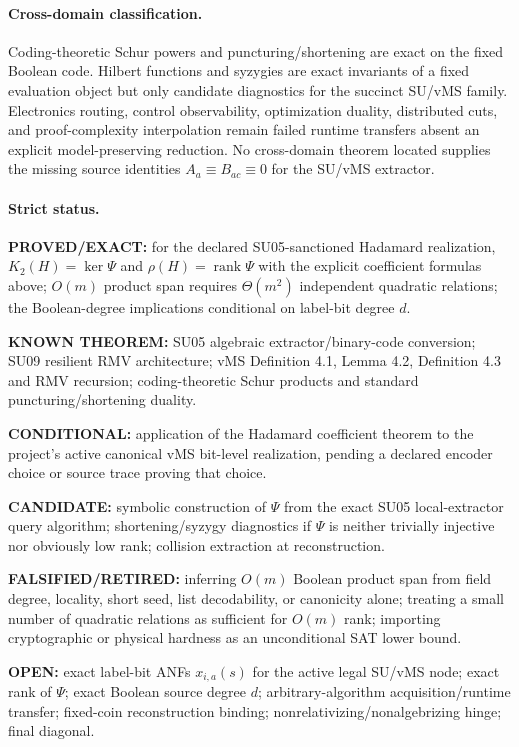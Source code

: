 \documentclass[11pt]{article}
\begin{document}
\paragraph{Cross-domain classification.}
Coding-theoretic Schur powers and puncturing/shortening are exact on the fixed Boolean code. Hilbert functions and syzygies are exact invariants of a fixed evaluation object but only candidate diagnostics for the succinct SU/vMS family. Electronics routing, control observability, optimization duality, distributed cuts, and proof-complexity interpolation remain failed runtime transfers absent an explicit model-preserving reduction. No cross-domain theorem located supplies the missing source identities $A_a\equiv B_{ac}\equiv0$ for the SU/vMS extractor.

\paragraph{Strict status.}
\textbf{PROVED/EXACT:} for the declared SU05-sanctioned Hadamard realization, $K_2(H)=\ker\Psi$ and $\rho(H)=\operatorname{rank}\Psi$ with the explicit coefficient formulas above; $O(m)$ product span requires $\Theta(m^2)$ independent quadratic relations; the Boolean-degree implications conditional on label-bit degree $d$.

\textbf{KNOWN THEOREM:} SU05 algebraic extractor/binary-code conversion; SU09 resilient RMV architecture; vMS Definition 4.1, Lemma 4.2, Definition 4.3 and RMV recursion; coding-theoretic Schur products and standard puncturing/shortening duality.

\textbf{CONDITIONAL:} application of the Hadamard coefficient theorem to the project's active canonical vMS bit-level realization, pending a declared encoder choice or source trace proving that choice.

\textbf{CANDIDATE:} symbolic construction of $\Psi$ from the exact SU05 local-extractor query algorithm; shortening/syzygy diagnostics if $\Psi$ is neither trivially injective nor obviously low rank; collision extraction at reconstruction.

\textbf{FALSIFIED/RETIRED:} inferring $O(m)$ Boolean product span from field degree, locality, short seed, list decodability, or canonicity alone; treating a small number of quadratic relations as sufficient for $O(m)$ rank; importing cryptographic or physical hardness as an unconditional SAT lower bound.

\textbf{OPEN:} exact label-bit ANFs $x_{i,a}(s)$ for the active legal SU/vMS node; exact rank of $\Psi$; exact Boolean source degree $d$; arbitrary-algorithm acquisition/runtime transfer; fixed-coin reconstruction binding; nonrelativizing/nonalgebrizing hinge; final diagonal.
\end{document}
